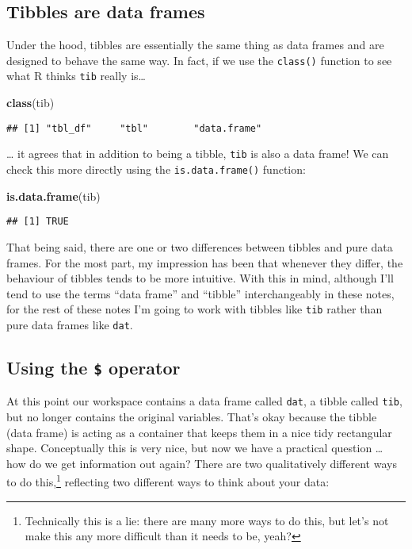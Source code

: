 \documentclass[]{book}
\newenvironment{Shaded}{\begin{snugshade}}{\end{snugshade}}
\newcommand{\KeywordTok}[1]{\textcolor[rgb]{0.13,0.29,0.53}{\textbf{#1}}}
\newcommand{\NormalTok}[1]{#1}
\let\rmarkdownfootnote\footnote%
\def\footnote{\protect\rmarkdownfootnote}
\begin{document}
\hypertarget{tibbles-are-data-frames}{%
\subsection{Tibbles are data frames}\label{tibbles-are-data-frames}}

Under the hood, tibbles are essentially the same thing as data frames and are designed to behave the same way. In fact, if we use the \texttt{class()} function to see what R thinks \texttt{tib} really is\ldots{}

\begin{Shaded}
\begin{Highlighting}[]
\KeywordTok{class}\NormalTok{(tib)}
\end{Highlighting}
\end{Shaded}

\begin{verbatim}
## [1] "tbl_df"     "tbl"        "data.frame"
\end{verbatim}

\ldots{} it agrees that in addition to being a tibble, \texttt{tib} is also a data frame! We can check this more directly using the \texttt{is.data.frame()} function:

\begin{Shaded}
\begin{Highlighting}[]
\KeywordTok{is.data.frame}\NormalTok{(tib)}
\end{Highlighting}
\end{Shaded}

\begin{verbatim}
## [1] TRUE
\end{verbatim}

That being said, there are one or two differences between tibbles and pure data frames. For the most part, my impression has been that whenever they differ, the behaviour of tibbles tends to be more intuitive. With this in mind, although I'll tend to use the terms ``data frame'' and ``tibble'' interchangeably in these notes, for the rest of these notes I'm going to work with tibbles like \texttt{tib} rather than pure data frames like \texttt{dat}.

\hypertarget{using-the-operator}{%
\subsection{\texorpdfstring{Using the \texttt{\$} operator}{Using the \$ operator}}\label{using-the-operator}}

At this point our workspace contains a data frame called \texttt{dat}, a tibble called \texttt{tib}, but no longer contains the original variables. That's okay because the tibble (data frame) is acting as a container that keeps them in a nice tidy rectangular shape. Conceptually this is very nice, but now we have a practical question \ldots{} how do we get information out again? There are two qualitatively different ways to do this,\footnote{Technically this is a lie: there are many more ways to do this, but let's not make this any more difficult than it needs to be, yeah?} reflecting two different ways to think about your data:
\end{document}
